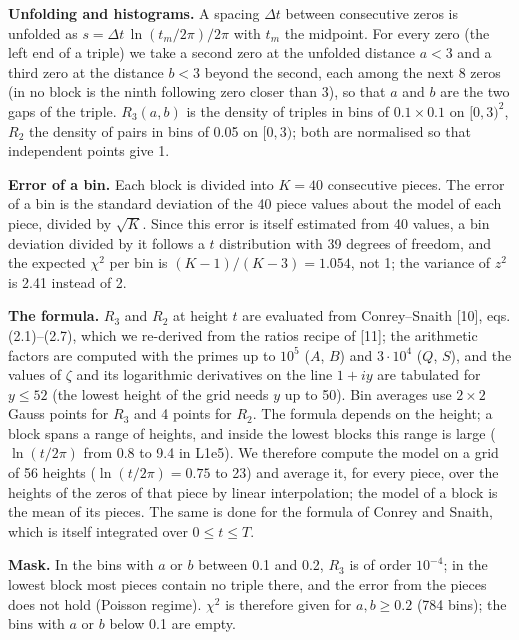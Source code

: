 \documentclass[
  10pt,
]{article}
\begin{document}
\textbf{Unfolding and histograms.} A spacing \(\Delta t\) between
consecutive zeros is unfolded as \(s = \Delta t\,\ln(t_m/2\pi)/2\pi\)
with \(t_m\) the midpoint. For every zero (the left end of a triple) we
take a second zero at the unfolded distance \(a < 3\) and a third zero
at the distance \(b < 3\) beyond the second, each among the next 8 zeros
(in no block is the ninth following zero closer than 3), so that \(a\)
and \(b\) are the two gaps of the triple. \(R_3(a, b)\) is the density
of triples in bins of \(0.1 \times 0.1\) on \([0, 3)^2\), \(R_2\) the
density of pairs in bins of 0.05 on \([0, 3)\); both are normalised so
that independent points give 1.

\textbf{Error of a bin.} Each block is divided into \(K = 40\)
consecutive pieces. The error of a bin is the standard deviation of the
40 piece values about the model of each piece, divided by \(\sqrt{K}\).
Since this error is itself estimated from 40 values, a bin deviation
divided by it follows a \(t\) distribution with 39 degrees of freedom,
and the expected \(\chi^2\) per bin is \((K-1)/(K-3) = 1.054\), not 1;
the variance of \(z^2\) is 2.41 instead of 2.

\textbf{The formula.} \(R_3\) and \(R_2\) at height \(t\) are evaluated
from Conrey--Snaith {[}10{]}, eqs. (2.1)--(2.7), which we re-derived
from the ratios recipe of {[}11{]}; the arithmetic factors are computed
with the primes up to \(10^5\) (\(A\), \(B\)) and \(3\cdot10^4\) (\(Q\),
\(S\)), and the values of \(\zeta\) and its logarithmic derivatives on
the line \(1 + iy\) are tabulated for \(y \le 52\) (the lowest height of
the grid needs \(y\) up to 50). Bin averages use \(2 \times 2\) Gauss
points for \(R_3\) and 4 points for \(R_2\). The formula depends on the
height; a block spans a range of heights, and inside the lowest blocks
this range is large (\(\ln(t/2\pi)\) from 0.8 to 9.4 in L1e5). We
therefore compute the model on a grid of 56 heights
(\(\ln(t/2\pi) = 0.75\) to 23) and average it, for every piece, over the
heights of the zeros of that piece by linear interpolation; the model of
a block is the mean of its pieces. The same is done for the formula of
Conrey and Snaith, which is itself integrated over \(0 \le t \le T\).

\textbf{Mask.} In the bins with \(a\) or \(b\) between 0.1 and 0.2,
\(R_3\) is of order \(10^{-4}\); in the lowest block most pieces contain
no triple there, and the error from the pieces does not hold (Poisson
regime). \(\chi^2\) is therefore given for \(a, b \ge 0.2\) (784 bins);
the bins with \(a\) or \(b\) below 0.1 are empty.
\end{document}
